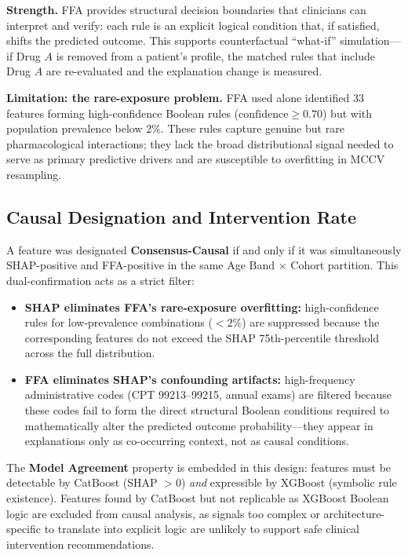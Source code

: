 \documentclass[
  12pt,
]{book}
\providecommand{\tightlist}{%
  \setlength{\itemsep}{0pt}\setlength{\parskip}{0pt}}
\begin{document}
\textbf{Strength.} FFA provides structural decision boundaries that
clinicians can interpret and verify: each rule is an explicit logical
condition that, if satisfied, shifts the predicted outcome. This
supports counterfactual ``what-if'' simulation---if Drug \(A\) is
removed from a patient's profile, the matched rules that include Drug
\(A\) are re-evaluated and the explanation change is measured.

\textbf{Limitation: the rare-exposure problem.} FFA used alone
identified 33 features forming high-confidence Boolean rules
(\(\text{confidence} \geq 0.70\)) but with population prevalence below
2\%. These rules capture genuine but rare pharmacological interactions;
they lack the broad distributional signal needed to serve as primary
predictive drivers and are susceptible to overfitting in MCCV
resampling.

\subsection{Causal Designation and Intervention
Rate}\label{causal-designation-and-intervention-rate}

A feature was designated \textbf{Consensus-Causal} if and only if it was
simultaneously SHAP-positive and FFA-positive in the same Age Band
\(\times\) Cohort partition. This dual-confirmation acts as a strict
filter:

\begin{itemize}
\tightlist
\item
  \textbf{SHAP eliminates FFA's rare-exposure overfitting:}
  high-confidence rules for low-prevalence combinations (\(<2\%\)) are
  suppressed because the corresponding features do not exceed the SHAP
  75th-percentile threshold across the full distribution.
\item
  \textbf{FFA eliminates SHAP's confounding artifacts:} high-frequency
  administrative codes (CPT 99213--99215, annual exams) are filtered
  because these codes fail to form the direct structural Boolean
  conditions required to mathematically alter the predicted outcome
  probability---they appear in explanations only as co-occurring
  context, not as causal conditions.
\end{itemize}

The \textbf{Model Agreement} property is embedded in this design:
features must be detectable by CatBoost (SHAP \(> 0\)) \emph{and}
expressible by XGBoost (symbolic rule existence). Features found by
CatBoost but not replicable as XGBoost Boolean logic are excluded from
causal analysis, as signals too complex or architecture-specific to
translate into explicit logic are unlikely to support safe clinical
intervention recommendations.
\end{document}
